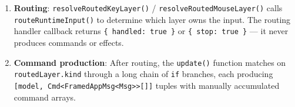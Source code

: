 \begin{enumerate}
\def\labelenumi{\arabic{enumi}.}
\item
  \textbf{Routing}: \texttt{r\allowbreak{}e\allowbreak{}s\allowbreak{}o\allowbreak{}l\allowbreak{}v\allowbreak{}e\allowbreak{}R\allowbreak{}o\allowbreak{}u\allowbreak{}t\allowbreak{}e\allowbreak{}d\allowbreak{}K\allowbreak{}e\allowbreak{}y\allowbreak{}L\allowbreak{}a\allowbreak{}y\allowbreak{}e\allowbreak{}r\allowbreak{}(\allowbreak{})} / \texttt{r\allowbreak{}e\allowbreak{}s\allowbreak{}o\allowbreak{}l\allowbreak{}v\allowbreak{}e\allowbreak{}R\allowbreak{}o\allowbreak{}u\allowbreak{}t\allowbreak{}e\allowbreak{}d\allowbreak{}M\allowbreak{}o\allowbreak{}u\allowbreak{}s\allowbreak{}e\allowbreak{}L\allowbreak{}a\allowbreak{}y\allowbreak{}e\allowbreak{}r\allowbreak{}(\allowbreak{})} calls \texttt{r\allowbreak{}o\allowbreak{}u\allowbreak{}t\allowbreak{}e\allowbreak{}R\allowbreak{}u\allowbreak{}n\allowbreak{}t\allowbreak{}i\allowbreak{}m\allowbreak{}e\allowbreak{}I\allowbreak{}n\allowbreak{}p\allowbreak{}u\allowbreak{}t\allowbreak{}(\allowbreak{})} to determine which layer owns the input. The routing handler callback returns \texttt{\{\allowbreak{} \allowbreak{}h\allowbreak{}a\allowbreak{}n\allowbreak{}d\allowbreak{}l\allowbreak{}e\allowbreak{}d\allowbreak{}:\allowbreak{} \allowbreak{}t\allowbreak{}r\allowbreak{}u\allowbreak{}e\allowbreak{} \allowbreak{}\}} or \texttt{\{\allowbreak{} \allowbreak{}s\allowbreak{}t\allowbreak{}o\allowbreak{}p\allowbreak{}:\allowbreak{} \allowbreak{}t\allowbreak{}r\allowbreak{}u\allowbreak{}e\allowbreak{} \allowbreak{}\}} --- it never produces commands or effects.
\item
  \textbf{Command production}: After routing, the \texttt{u\allowbreak{}p\allowbreak{}d\allowbreak{}a\allowbreak{}t\allowbreak{}e\allowbreak{}(\allowbreak{})} function matches on \texttt{r\allowbreak{}o\allowbreak{}u\allowbreak{}t\allowbreak{}e\allowbreak{}d\allowbreak{}L\allowbreak{}a\allowbreak{}y\allowbreak{}e\allowbreak{}r\allowbreak{}.\allowbreak{}k\allowbreak{}i\allowbreak{}n\allowbreak{}d} through a long chain of \texttt{i\allowbreak{}f} branches, each producing \texttt{[\allowbreak{}m\allowbreak{}o\allowbreak{}d\allowbreak{}e\allowbreak{}l\allowbreak{},\allowbreak{} \allowbreak{}C\allowbreak{}m\allowbreak{}d\allowbreak{}<\allowbreak{}F\allowbreak{}r\allowbreak{}a\allowbreak{}m\allowbreak{}e\allowbreak{}d\allowbreak{}A\allowbreak{}p\allowbreak{}p\allowbreak{}M\allowbreak{}s\allowbreak{}g\allowbreak{}<\allowbreak{}M\allowbreak{}s\allowbreak{}g\allowbreak{}>\allowbreak{}>\allowbreak{}[\allowbreak{}]\allowbreak{}]} tuples with manually accumulated command arrays.
\end{enumerate}

